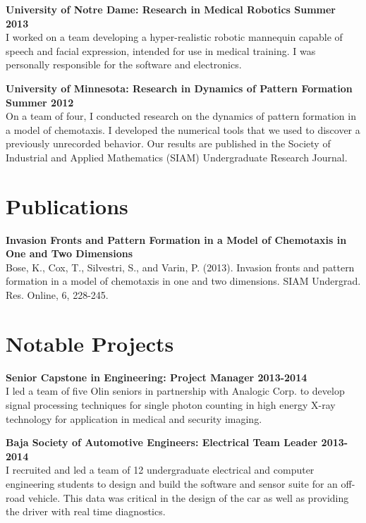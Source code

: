 \documentclass{article}
\newcommand{\newitem}[2]{\noindent\textbf{#1 \hfill #2}\\}
\newcommand{\gimmespace}{\vspace{1em}}
\begin{document}
\newitem{University of Notre Dame: Research in Medical Robotics}{Summer 2013}
I worked on a team developing a hyper-realistic robotic mannequin capable of speech and facial expression, intended for use in medical training. I was personally responsible for the software and electronics.
\gimmespace

\newitem{University of Minnesota: Research in Dynamics of Pattern Formation}{Summer 2012}
On a team of four, I conducted research on the dynamics of pattern formation in a model of chemotaxis. I developed the numerical tools that we used to discover a previously unrecorded behavior. Our results are published in the Society of Industrial and Applied Mathematics (SIAM) Undergraduate Research Journal.

\section*{Publications}
\newitem{Invasion Fronts and Pattern Formation in a Model of Chemotaxis in One and Two Dimensions}{}
Bose, K., Cox, T., Silvestri, S., and Varin, P. (2013). Invasion fronts and pattern formation in a model of chemotaxis in one and two dimensions. SIAM Undergrad. Res. Online, 6, 228-245.

\section*{Notable Projects}
\newitem{Senior Capstone in Engineering: Project Manager}{2013-2014}
I led a team of five Olin seniors in partnership with Analogic Corp. to develop signal processing techniques for single photon counting in high energy X-ray technology for application in medical and security imaging.
\gimmespace

\newitem{Baja Society of Automotive Engineers: Electrical Team Leader}{2013-2014}
I recruited and led a team of 12 undergraduate electrical and computer engineering students to design and build the software and sensor suite for an off-road vehicle. This data was critical in the design of the car as well as providing the driver with real time diagnostics.
\end{document}
